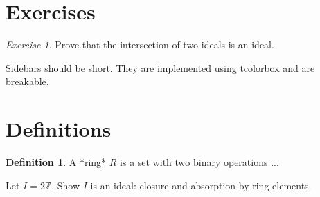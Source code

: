 \documentclass[12pt,oneside]{book}
\theoremstyle{definition}
\newtheorem{definition}[theorem]{Definition}
\theoremstyle{remark}
\newtheorem{exercise}[theorem]{Exercise}
\begin{document}
\section{Exercises}
\begin{exercise}
Prove that the intersection of two ideals is an ideal.
\end{exercise}



\begin{sidebarbox}
Sidebars should be short. They are implemented using tcolorbox and are breakable.
\end{sidebarbox}




\section{Definitions}
\begin{definition}
A *ring* \(R\) is a set with two binary operations ...
\end{definition}

\begin{workedexample}
Let \(I=2\mathbb{Z}\). Show $I$ is an ideal: closure and absorption by ring elements.
\end{workedexample}
\end{document}
